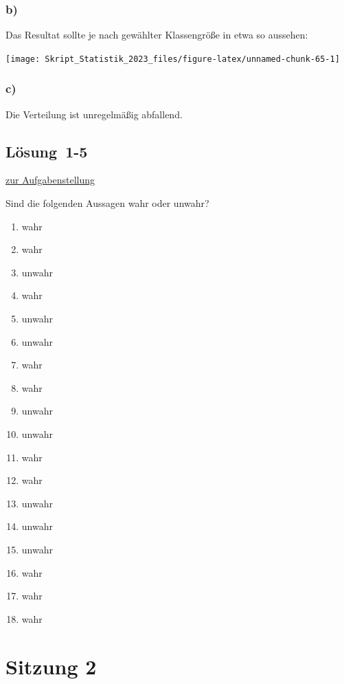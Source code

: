 \documentclass[
  11pt,
  ngerman,
  a4paper,
]{report}
\providecommand{\tightlist}{%
  \setlength{\itemsep}{0pt}\setlength{\parskip}{0pt}}
\begin{document}
\hypertarget{b-1}{%
\subsubsection{b)}\label{b-1}}

Das Resultat sollte je nach gewählter Klassengröße in etwa so aussehen:

\begin{center}\texttt{[image: Skript\_Statistik\_2023\_files/figure-latex/unnamed-chunk-65-1]} \end{center}

\hypertarget{c-1}{%
\subsubsection{c)}\label{c-1}}

Die Verteilung ist unregelmäßig abfallend.

\hypertarget{loesung-1-5}{%
\subsection{Lösung~1-5}\label{loesung-1-5}}

\protect\hyperlink{aufgabe-1-5}{zur Aufgabenstellung}

Sind die folgenden Aussagen wahr oder unwahr?

\begin{enumerate}
\def\labelenumi{\alph{enumi})}
\tightlist
\item
  wahr
\item
  wahr
\item
  unwahr
\item
  wahr
\item
  unwahr
\item
  unwahr
\item
  wahr
\item
  wahr
\item
  unwahr
\item
  unwahr
\item
  wahr
\item
  wahr
\item
  unwahr
\item
  unwahr
\item
  unwahr
\item
  wahr
\item
  wahr
\item
  wahr
\end{enumerate}

\hypertarget{sitzung-2}{%
\section*{Sitzung 2}\label{sitzung-2}}
\end{document}
